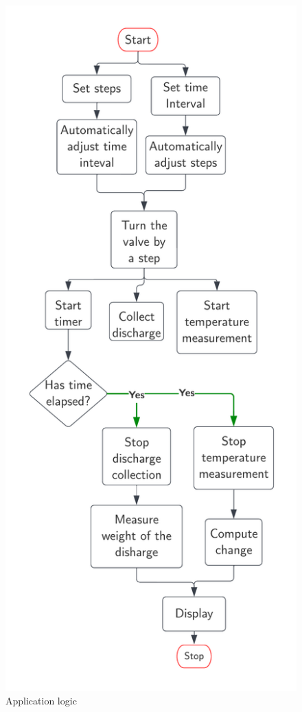 \begin{figure}[H]
    \centering
    \includegraphics[width=\textwidth, height=0.8\textheight, keepaspectratio]{Figures/ApplicationLogic.png}
    \caption{Application logic}
    \label{fig:application_logic}
\end{figure}


